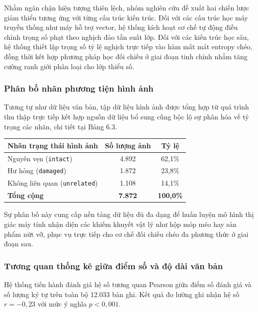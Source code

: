 Nhằm ngăn chặn hiện tượng thiên lệch, nhóm nghiên cứu đề xuất hai chiến lược giảm thiểu tương ứng với từng cấu trúc kiến trúc. Đối với các cấu trúc học máy truyền thống như máy hỗ trợ vector, hệ thống kích hoạt cơ chế tự động điều chỉnh trọng số phạt theo nghịch đảo tần suất lớp. Đối với các kiến trúc học sâu, hệ thống thiết lập trọng số tỷ lệ nghịch trực tiếp vào hàm mất mát entropy chéo, đồng thời kết hợp phương pháp học đối chiếu ở giai đoạn tinh chỉnh nhằm tăng cường ranh giới phân loại cho lớp thiểu số.

\subsubsection{Phân bố nhãn phương tiện hình ảnh}

Tương tự như dữ liệu văn bản, tập dữ liệu hình ảnh được tổng hợp từ quá trình thu thập trực tiếp kết hợp nguồn dữ liệu bổ sung cũng bộc lộ sự phân hóa về tỷ trọng các nhãn, chi tiết tại Bảng 6.3.

\begin{center}
\renewcommand{\arraystretch}{1.4}
\begin{tabularx}{\textwidth}{|X|c|c|}
\hline
\rowcolor[HTML]{E8E8E8}
\textbf{Nhãn trạng thái hình ảnh} & \textbf{Số lượng ảnh} & \textbf{Tỷ lệ} \\
\hline
Nguyên vẹn (\texttt{intact}) & 4.892 & 62,1\% \\
\hline
Hư hỏng (\texttt{damaged}) & 1.872 & 23,8\% \\
\hline
Không liên quan (\texttt{unrelated}) & 1.108 & 14,1\% \\
\hline
\textbf{Tổng cộng} & \textbf{7.872} & \textbf{100,0\%} \\
\hline
\end{tabularx}
\end{center}

Sự phân bố này cung cấp nền tảng dữ liệu đủ đa dạng để huấn luyện mô hình thị giác máy tính nhận diện các khiếm khuyết vật lý như hộp móp méo hay sản phẩm nứt vỡ, phục vụ trực tiếp cho cơ chế đối chiếu chéo đa phương thức ở giai đoạn sau.

\subsubsection{Tương quan thống kê giữa điểm số và độ dài văn bản}

Hệ thống tiến hành đánh giá hệ số tương quan Pearson giữa điểm số đánh giá và số lượng ký tự trên toàn bộ 12.033 bản ghi. Kết quả đo lường ghi nhận hệ số $r = -0{,}23$ với mức ý nghĩa $p < 0{,}001$. 


